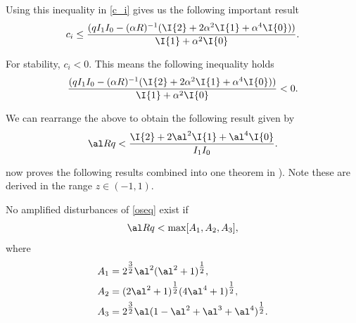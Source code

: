 Using this inequality in \eqref{c_i} gives us the following important result
\begin{equation}
        c_i \leq \frac{(q I_1 I_0 - (\alpha R)^{-1} (\I{2} + 2 \alpha^2 \I{1} + \alpha^4 \I{0}))}{\I{1} + \alpha^2 \I{0}}.
\label{c_iineq}
\end{equation}

For stability, $ c_i < 0 $. This means the following inequality holds
\begin{equation}
    \frac{(q I_1 I_0 - (\alpha R)^{-1} (\I{2} + 2 \alpha^2 \I{1} + \alpha^4 \I{0}))}{\I{1} + \alpha^2 \I{0}} < 0.
\label{stabineq}
\end{equation}

We can rearrange the above to obtain the following result given by \citet{joseph1968eigenvalue}
\begin{equation}
    \al R q < \frac{\I{2} + 2 \al^2 \I{1} + \al^4 \I{0}}{I_1 I_0}.
\label{jaRq}
\end{equation}

\citet{synge1938hydrodynamical} now proves the following results combined into one theorem in \citet{joseph1968eigenvalue}). Note these are derived in the range $ z \in (-1, 1) $.

\begin{theorem}
No amplified disturbances of \eqref{oseq} exist if 
\begin{equation}
    \al R q < \max[A_1, A_2, A_3],
\end{equation}
where 
\begin{align}
    A_1 &= 2^{\tfrac{3}{2}} \al^2 (\al^2 + 1)^{\tfrac{1}{2}}, \nonumber\\
    A_2 &= (2 \al^2 + 1)^{\tfrac{1}{2}}(4 \al^4 + 1)^{\tfrac{1}{2}}, \nonumber\\
    A_3 &= 2^{\tfrac{3}{2}} \al (1 - \al^2 + \al^3 + \al^4)^{\tfrac{1}{2}}.
    \label{sbounds}
\end{align}
\end{theorem}


